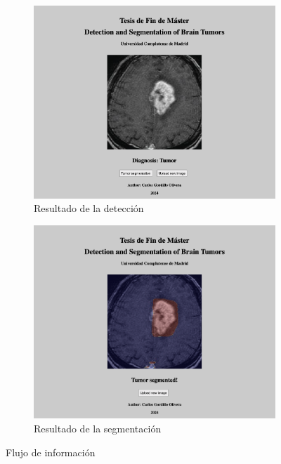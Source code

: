 \begin{figure}[H]
    \vspace{0.5cm} %
    
    \begin{subfigure}[b]{0.45\textwidth}
        \centering
        \includegraphics[width=\textwidth]{chapters/api/images/deteccion.png}
        \caption{Resultado de la detección}
        \label{fig:imagen3}
    \end{subfigure}
    \hfill
    \begin{subfigure}[b]{0.45\textwidth}
        \centering
        \includegraphics[width=\textwidth]{chapters/api/images/segmentacion.png}
        \caption{Resultado de la segmentación}
        \label{fig:imagen4}
    \end{subfigure}
    \caption{Flujo de información}
    \label{fig.web}
\end{figure}


